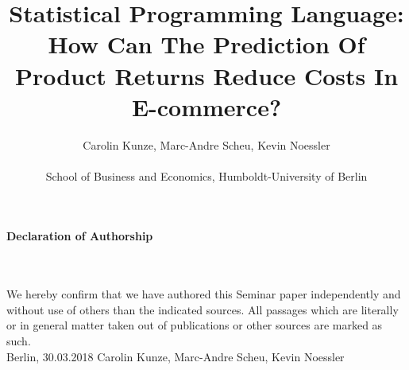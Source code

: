 \documentclass[12pt]{article}
\begin{document}
 
\begin{titlepage}

\baselineskip24pt
\title{Statistical Programming Language: \\
How Can The Prediction Of Product Returns Reduce Costs In E-commerce?
}

\author
{Carolin Kunze, Marc-Andre Scheu, Kevin Noessler\\
\\
\normalsize{School of Business and Economics, Humboldt-University of Berlin}\\
}

\date{}
\end{titlepage}
\clearpage\maketitle
\thispagestyle{empty}


\newpage
\clearpage
\thispagestyle{empty}

\begin{large}
\textbf{Declaration of Authorship}
\end{large}
\\
\\

We hereby confirm that we have authored this Seminar paper independently and without use
of others than the indicated sources. All passages which are literally or in general matter taken
out of publications or other sources are marked as such.\\

Berlin, 30.03.2018 \quad\quad Carolin Kunze, Marc-Andre Scheu, Kevin Noessler

\newpage
\clearpage\maketitle
\thispagestyle{empty}
\tableofcontents



\newpage
\setcounter{page}{1}
\end{document}
